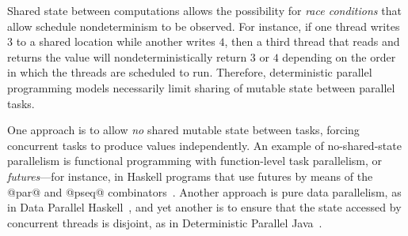 \documentclass{article}
\begin{document}
Shared state between computations allows the possibility for
\emph{race conditions} that allow schedule nondeterminism to be
observed.  For instance, if one thread writes $3$ to a shared location
while another writes $4$, then a third thread that reads and returns
the value will nondeterministically return $3$ or $4$ depending on the
order in which the threads are scheduled to run.  Therefore,
deterministic parallel programming models necessarily limit sharing of
mutable state between parallel tasks.

One approach is to allow \emph{no} shared mutable state between tasks,
forcing concurrent tasks to produce values independently.  An example
of no-shared-state parallelism is functional programming with
function-level task parallelism, or \emph{futures}---for instance, in
Haskell programs that use futures by means of the @par@ and @pseq@
combinators~\cite{marlow-par}.  Another approach is pure data
parallelism, as in Data Parallel Haskell~\cite{dph}, and yet another
is to ensure that the state accessed by concurrent threads is
disjoint, as in Deterministic Parallel Java~\cite{dpj-oopsla}.
\end{document}
